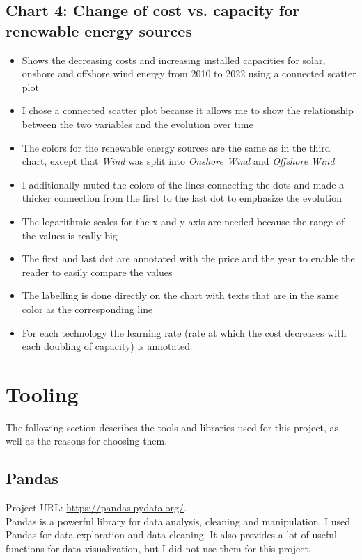 \documentclass{article}
\begin{document}
\subsection{Chart 4: Change of cost vs. capacity for renewable energy sources}
\begin{itemize}
    \item Shows the decreasing costs and increasing installed capacities for solar, onshore and offshore wind energy from 2010 to 2022 using a connected scatter plot
    \item I chose a connected scatter plot because it allows me to show the relationship between the two variables and the evolution over time
    \item The colors for the renewable energy sources are the same as in the third chart, except that \textit{Wind} was split into \textit{Onshore Wind} and \textit{Offshore Wind}
    \item I additionally muted the colors of the lines connecting the dots and made a thicker connection from the first to the last dot to emphasize the evolution
    \item The logarithmic scales for the x and y axis are needed because the range of the values is really big
    \item The first and last dot are annotated with the price and the year to enable the reader to easily compare the values
    \item The labelling is done directly on the chart with texts that are in the same color as the corresponding line
    \item For each technology the learning rate (rate at which the cost decreases with each doubling of capacity) is annotated
\end{itemize}

\newpage

\section{Tooling}
The following section describes the tools and libraries used for this project, as well as the reasons for choosing them.

\subsection{Pandas}
Project URL: \url{https://pandas.pydata.org/}.\\
Pandas is a powerful library for data analysis, cleaning and manipulation.
I used Pandas for data exploration and data cleaning.
It also provides a lot of useful functions for data visualization, but I did not use them for this project.
\end{document}
